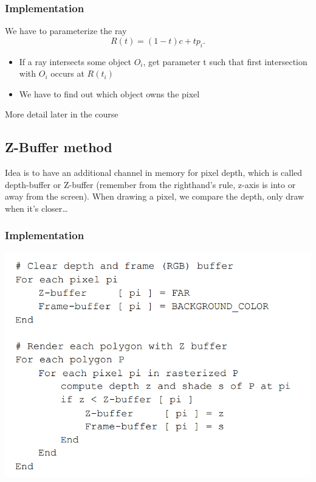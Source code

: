 \documentclass[11pt]{article}
\begin{document}
\subsubsection*{Implementation}
We have to parameterize the ray \[
R(t) = (1-t)c + tp_i
.\] 
\begin{itemize}
    \item If a ray intersects some object $O_i$, get parameter t such that first intersection with $O_i$ occurs at $R(t_i)$
    \item We have to find out which object owns the pixel 
\end{itemize}

More detail later in the course


\subsection{Z-Buffer method}
Idea is to have an additional channel in memory for pixel depth, which is called depth-buffer or Z-buffer (remember from the righthand's rule, z-axis is into or away from the screen). When drawing a pixel, we compare the depth, only draw when it's closer\dots

\subsubsection*{Implementation}
\includegraphics[scale=.8]{z_buff_implem}
\end{document}
